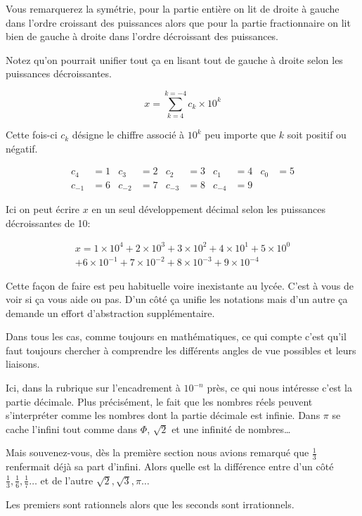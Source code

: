 \documentclass[a4paper, 11pt, twoside]{book}
\begin{document}
Vous remarquerez la symétrie, pour la partie entière on lit de
droite à gauche dans l'ordre croissant des puissances alors que pour
la partie fractionnaire on lit bien de gauche à droite dans
l'ordre décroissant des puissances.


Notez qu'on pourrait unifier tout ça en lisant tout de gauche à
droite selon les puissances décroissantes.

\[x = \sum_{k = 4}^{k = -4}c_k\times 10^k\]

Cette fois-ci \(c_k\) désigne le chiffre associé à \(10^k\) peu importe
que \(k\) soit positif ou négatif.

\begin{align*}
c_4 &= 1 & c_3 &= 2 & c_2 &= 3 & c_1 &= 4 & c_0 &= 5\\
c_{-1} &= 6 & c_{-2} &= 7 & c_{-3} &= 8 & c_{-4} &= 9
\end{align*}

Ici on peut écrire \(x\) en un seul développement décimal selon les
puissances décroissantes de 10:

\begin{multline}
x = 1\times 10^4 + 2\times 10^3 + 3\times 10^2 + 4\times 10^1 + 5\times 10^0 \\
+ 6\times 10^{-1} + 7\times 10^{-2} + 8\times 10^{-3} + 9\times 10^{-4}
\end{multline}

Cette façon de faire est peu habituelle voire inexistante au
lycée. C'est à vous de voir si ça vous aide ou pas. D'un côté ça
unifie les notations mais d'un autre ça demande un effort
d'abstraction supplémentaire.

Dans tous les cas, comme toujours en mathématiques, ce qui compte
c'est qu'il faut toujours chercher à comprendre les différents
angles de vue possibles et leurs liaisons.

Ici, dans la rubrique sur l'encadrement à \(10^{-n}\) près, ce qui
nous intéresse c'est la partie décimale. Plus précisément, le fait
que les nombres réels peuvent s'interpréter comme les nombres dont
la partie décimale est infinie. Dans \(\pi\) se cache l'infini tout
comme dans \(\Phi\), \(\sqrt{2}\) et une infinité de nombres\ldots{}

Mais souvenez-vous, dès la première section nous avions remarqué
que \(\frac{1}{3}\) renfermait déjà sa part d'infini. Alors quelle
est la différence entre d'un côté \(\frac{1}{3}, \frac{1}{6},
    \frac{1}{7}\dots\) et de l'autre \(\sqrt{2}, \sqrt{3}, \pi\dots\)

Les premiers sont rationnels alors que les seconds sont irrationnels.
\stopcontents[level-2]
\end{document}
